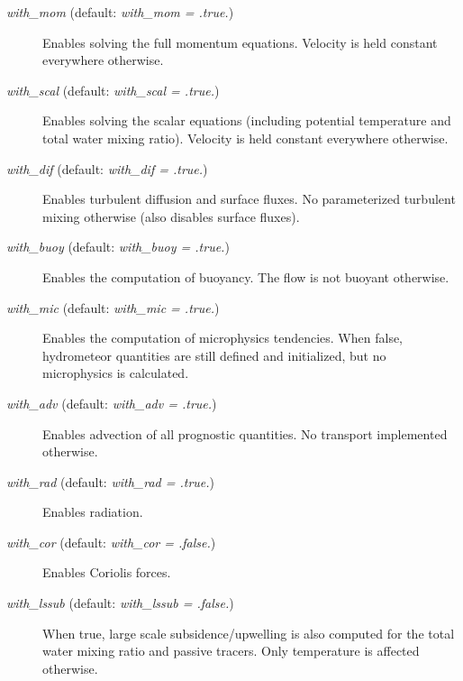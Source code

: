 \documentclass[12pt,A4,french]{article}
\begin{document}
\begin{description}

\item[{\it with\_mom} (default: {\it with\_mom = .true.})]

Enables solving the full momentum equations. Velocity is held constant everywhere otherwise.

\item[{\it with\_scal} (default: {\it with\_scal = .true.})]

Enables solving the scalar equations (including potential temperature and total water mixing ratio). Velocity is held constant everywhere otherwise.

\item[{\it with\_dif} (default: {\it with\_dif = .true.})]

Enables turbulent diffusion and surface fluxes. No parameterized turbulent mixing otherwise (also disables surface fluxes).

\item[{\it with\_buoy} (default: {\it with\_buoy = .true.})]

Enables the computation of buoyancy. The flow is not buoyant otherwise.

\item[{\it with\_mic} (default: {\it with\_mic = .true.})]

Enables the computation of microphysics tendencies. When false, hydrometeor quantities are still defined and initialized, but no microphysics is calculated.

\item[{\it with\_adv} (default: {\it with\_adv = .true.})]

Enables advection of all prognostic quantities. No transport implemented otherwise.

\item[{\it with\_rad} (default: {\it with\_rad = .true.})]

Enables radiation.

\item[{\it with\_cor} (default: {\it with\_cor = .false.})]

Enables Coriolis forces. 

\item[{\it with\_lssub} (default: {\it with\_lssub = .false.})]

When true, large scale subsidence/upwelling is also computed for the total water mixing ratio and passive tracers. Only temperature is affected otherwise.


\end{description}
\end{document}
